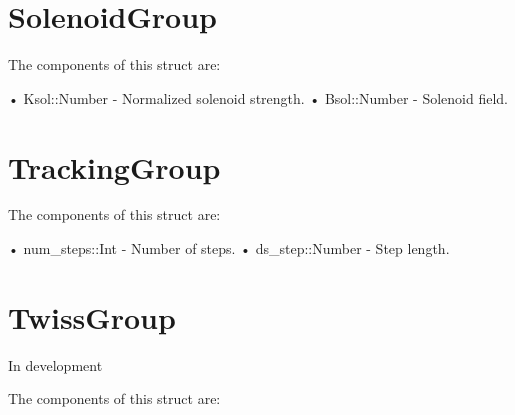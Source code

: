 \section{SolenoidGroup}
\label{s:solenoid.g}

The components of this struct are:
\begin{example}
• Ksol::Number        - Normalized solenoid strength.       
• Bsol::Number        - Solenoid field. 
\end{example}

\section{TrackingGroup}
\label{s:tracking.g}

The components of this struct are:
\begin{example}
• num_steps::Int    - Number of steps. 
• ds_step::Number   - Step length. 
\end{example}

\section{TwissGroup}
\label{s:twiss.g}

In development

The components of this struct are:
\begin{example}
\end{example}
